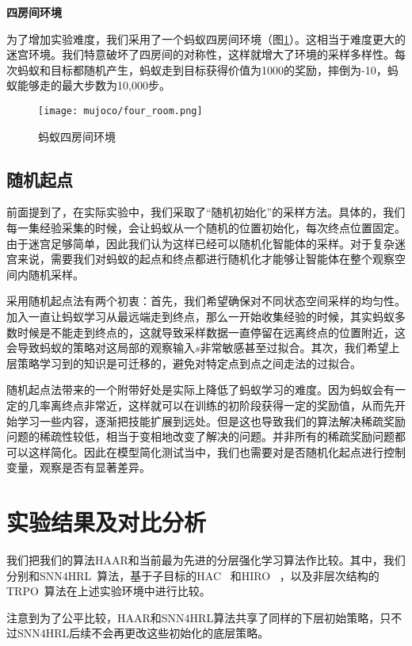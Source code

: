 \vspace{0.5cm}
\textbf{四房间环境}

为了增加实验难度，我们采用了一个蚂蚁四房间环境（图\ref{fig:ant_four_room}）。这相当于难度更大的迷宫环境。我们特意破坏了四房间的对称性，这样就增大了环境的采样多样性。每次蚂蚁和目标都随机产生，蚂蚁走到目标获得价值为1000的奖励，摔倒为-10，蚂蚁能够走的最大步数为10,000步。
\begin{figure}[h]
    \centering
    \texttt{[image: mujoco/four\_room.png]}
    \caption{蚂蚁四房间环境}
    \label{fig:ant_four_room}
\end{figure}

\subsection{随机起点}
前面提到了，在实际实验中，我们采取了``随机初始化''的采样方法。具体的，我们每一集经验采集的时候，会让蚂蚁从一个随机的位置初始化，每次终点位置固定。由于迷宫足够简单，因此我们认为这样已经可以随机化智能体的采样。对于复杂迷宫来说，需要我们对蚂蚁的起点和终点都进行随机化才能够让智能体在整个观察空间内随机采样。

采用随机起点法有两个初衷：首先，我们希望确保对不同状态空间采样的均匀性。加入一直让蚂蚁学习从最远端走到终点，那么一开始收集经验的时候，其实蚂蚁多数时候是不能走到终点的，这就导致采样数据一直停留在远离终点的位置附近，这会导致蚂蚁的策略对这局部的观察输入$s$非常敏感甚至过拟合。其次，我们希望上层策略学习到的知识是可迁移的，避免对特定点到点之间走法的过拟合。

随机起点法带来的一个附带好处是实际上降低了蚂蚁学习的难度。因为蚂蚁会有一定的几率离终点非常近，这样就可以在训练的初阶段获得一定的奖励值，从而先开始学习一些内容，逐渐把技能扩展到远处。但是这也导致我们的算法解决稀疏奖励问题的稀疏性较低，相当于变相地改变了解决的问题。并非所有的稀疏奖励问题都可以这样简化。因此在模型简化测试当中，我们也需要对是否随机化起点进行控制变量，观察是否有显著差异。

\section{实验结果及对比分析}
我们把我们的算法HAAR和当前最为先进的分层强化学习算法作比较。其中，我们分别和SNN4HRL~\cite{SNN4hrl}算法，基于子目标的HAC ~\cite{HAC}和HIRO ~\cite{HIRO}，以及非层次结构的TRPO~\cite{TRPO}算法在上述实验环境中进行比较。

注意到为了公平比较，HAAR和SNN4HRL算法共享了同样的下层初始策略，只不过SNN4HRL后续不会再更改这些初始化的底层策略。

